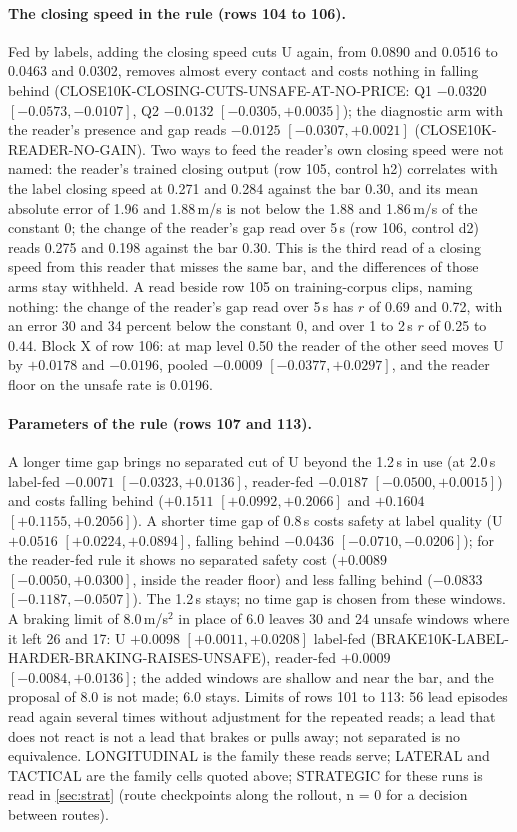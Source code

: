 \paragraph{The closing speed in the rule (rows 104 to 106).} Fed by labels, adding the closing speed cuts U again, from 0.0890 and 0.0516 to 0.0463 and 0.0302, removes almost every contact and costs nothing in falling behind (CLOSE10K-CLOSING-CUTS-UNSAFE-AT-NO-PRICE: Q1 $-0.0320$ $[-0.0573,-0.0107]$, Q2 $-0.0132$ $[-0.0305,+0.0035]$); the diagnostic arm with the reader's presence and gap reads $-0.0125$ $[-0.0307,+0.0021]$ (CLOSE10K-READER-NO-GAIN). Two ways to feed the reader's own closing speed were not named: the reader's trained closing output (row 105, control h2) correlates with the label closing speed at 0.271 and 0.284 against the bar 0.30, and its mean absolute error of 1.96 and 1.88\,m/s is not below the 1.88 and 1.86\,m/s of the constant 0; the change of the reader's gap read over 5\,s (row 106, control d2) reads 0.275 and 0.198 against the bar 0.30. This is the third read of a closing speed from this reader that misses the same bar, and the differences of those arms stay withheld. A  read beside row 105 on training-corpus clips, naming nothing: the change of the reader's gap read over 5\,s has $r$ of 0.69 and 0.72, with an error 30 and 34 percent below the constant 0, and over 1 to 2\,s $r$ of 0.25 to 0.44. Block X of row 106: at map level 0.50 the reader of the other seed moves U by $+0.0178$ and $-0.0196$, pooled $-0.0009$ $[-0.0377,+0.0297]$, and the reader floor on the unsafe rate is 0.0196.

\paragraph{Parameters of the rule (rows 107 and 113).} A longer time gap brings no separated cut of U beyond the 1.2\,s in use (at 2.0\,s label-fed $-0.0071$ $[-0.0323,+0.0136]$, reader-fed $-0.0187$ $[-0.0500,+0.0015]$) and costs falling behind ($+0.1511$ $[+0.0992,+0.2066]$ and $+0.1604$ $[+0.1155,+0.2056]$). A shorter time gap of 0.8\,s costs safety at label quality (U $+0.0516$ $[+0.0224,+0.0894]$, falling behind $-0.0436$ $[-0.0710,-0.0206]$); for the reader-fed rule it shows no separated safety cost ($+0.0089$ $[-0.0050,+0.0300]$, inside the reader floor) and less falling behind ($-0.0833$ $[-0.1187,-0.0507]$). The 1.2\,s stays; no time gap is chosen from these windows. A braking limit of 8.0\,m/s$^2$ in place of 6.0 leaves 30 and 24 unsafe windows where it left 26 and 17: U $+0.0098$ $[+0.0011,+0.0208]$ label-fed (BRAKE10K-LABEL-HARDER-BRAKING-RAISES-UNSAFE), reader-fed $+0.0009$ $[-0.0084,+0.0136]$; the added windows are shallow and near the bar, and the proposal of 8.0 is not made; 6.0 stays. Limits of rows 101 to 113: 56 lead episodes read again several times without adjustment for the repeated reads; a lead that does not react is not a lead that brakes or pulls away; not separated is no equivalence. LONGITUDINAL is the family these reads serve; LATERAL and TACTICAL are the family cells quoted above; STRATEGIC for these runs is read in \cref{sec:strat} (route checkpoints along the rollout, n = 0 for a decision between routes).
